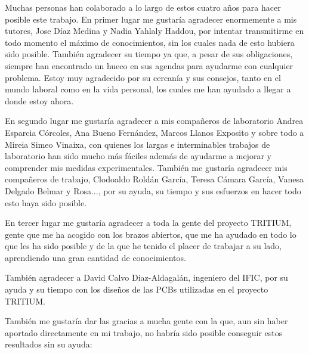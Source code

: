 Muchas personas han colaborado a lo largo de estos cuatro años para hacer posible este trabajo. En primer lugar me gustaría agradecer enormemente a mis tutores, Jose Díaz Medina y Nadia Yahlaly Haddou, por intentar transmitirme en todo momento el máximo de conocimientos, sin los cuales nada de esto hubiera sido posible. También agradecer su tiempo ya que, a pesar de sus obligaciones, siempre han encontrado un hueco en sus agendas para ayudarme con cualquier problema. Estoy muy agradecido por su cercanía y sus consejos, tanto en el mundo laboral como en la vida personal, los cuales me han ayudado a llegar a donde estoy ahora.

En segundo lugar me gustaría agradecer a mis compañeros de laboratorio Andrea Esparcia Córcoles, Ana Bueno Fernández, Marcos Llanos Exposito y sobre todo a Mireia Simeo Vinaixa, con quienes los largas e interminables trabajos de laboratorio han sido mucho más fáciles además de ayudarme a mejorar y comprender mis medidas experimentales.  También me gustaría agradecer mis compañeros de trabajo, Clodoaldo Roldán García, Teresa Cámara García, Vanesa Delgado Belmar y Rosa..., por su ayuda, su tiempo y sus esfuerzos en hacer todo esto haya sido posible.

En tercer lugar me gustaría agradecer a toda la gente del proyecto TRITIUM, gente que me ha acogido con los brazos abiertos, que me ha ayudado en todo lo que les ha sido posible y de la que he tenido el placer de trabajar a su lado, aprendiendo una gran cantidad de conocimientos.

También agradecer a David Calvo Diaz-Aldagalán, ingeniero del IFIC, por su ayuda y su tiempo con los diseños de las PCBs utilizadas en el proyecto TRITIUM.

También me gustaría dar las gracias a mucha gente con la que, aun sin haber aportado directamente en mi trabajo, no habría sido posible conseguir estos resultados sin su ayuda:

